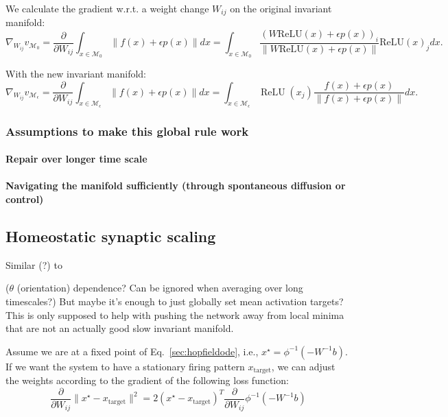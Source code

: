 \documentclass{article}
\newcommand{\ascomment}[1]{\textcolor{ascolor}{(#1)}}
\theoremstyle{definition} \newtheorem{definition}{Definition}
\theoremstyle{remark} \newtheorem{remark}{Remark}
\newcommand{\manifold}{\mathcal{M}}
\newcommand{\relu}{\operatorname{ReLU}}
\newcounter{ct}
\begin{document}
We calculate the gradient w.r.t. a weight change $W_{ij}$ on the original invariant manifold:
\begin{equation}
\nabla_{W_{ij}}v_{\manifold_0} = \frac{\partial}{\partial W_{ij}}\int_{x\in\manifold_0}  \|f(x) + \epsilon p(x)\|dx = \int_{x\in\manifold_0} 
\frac{(W \text{ReLU}(x) + \epsilon p(x))_i}{\| W \text{ReLU}(x) + \epsilon p(x) \|} \text{ReLU}(x)_j
dx.
\end{equation}



With the new invariant manifold:
\begin{equation}
\nabla_{W_{ij}}v_{\manifold_\epsilon} = \frac{\partial}{\partial W_{ij}}\int_{x\in\manifold_{\epsilon}}  \|f(x) + \epsilon p(x)\|dx = \int_{x\in\manifold_{\epsilon}}  \relu(x_j)\frac{f(x) + \epsilon p(x)}{\|f(x) +\epsilon p(x) \|}dx.
\end{equation}


\subsubsection{Assumptions to make this global rule work}

 
\paragraph{Repair over longer time scale}
 
\paragraph{Navigating the manifold sufficiently (through spontaneous diffusion or control)}


\subsection{Homeostatic synaptic scaling}
Similar (?) to \citep{renart2003robust}

\ascomment{$\theta$ (orientation) dependence? Can be ignored when averaging over long timescales?}
But maybe it's enough to just globally set mean activation targets?
This is only supposed to help with pushing the network away from local minima that are not an actually good slow invariant manifold.



Assume we are at a fixed point of Eq.~\ref{sec:hopfieldode}, i.e., $x^\star = \phi^{-1}(-W^{-1}b)$. %
If we want the system to have a stationary firing pattern $x_{\operatorname{target}}$, we can adjust the weights according to the gradient of the following loss function:
\begin{equation}\label{eq:synscaling_gradient}
\frac{\partial}{\partial W_{ij}} \|x^\star - x_{\operatorname{target}}\|^2 = 2(x^\star - x_{\operatorname{target}})^T\frac{\partial}{\partial W_{ij}} \phi^{-1}(-W^{-1}b)
\end{equation}
\end{document}
